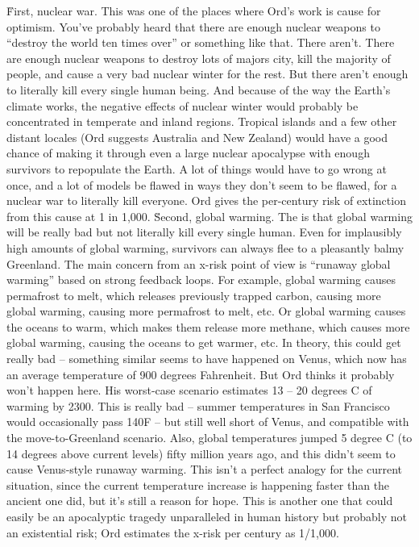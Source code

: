 \begin{xmlentries}
\begin{xmlentriescontent}
{\p\u{First}, nuclear war. This was one of the places where Ord’s work is cause for optimism. You’ve probably heard that there are enough nuclear weapons to “destroy the world ten times over” or something like that. There aren’t. There are enough nuclear weapons to destroy lots of majors city, kill the majority of people, and cause a very bad nuclear winter for the rest. But there aren’t enough to literally kill every single human being. And because of the way the Earth’s climate works, the negative effects of nuclear winter would probably be concentrated in temperate and inland regions. Tropical islands and a few other distant locales (Ord suggests Australia and New Zealand) would have a good chance of making it through even a large nuclear apocalypse with enough survivors to repopulate the Earth. A lot of things would have to go wrong at once, and a lot of models be flawed in ways they don’t seem to be flawed, for a nuclear war to literally kill everyone. Ord gives the per-century risk of extinction from this cause at 1 in 1,000.
\p\u{Second}, global warming. The  is that global warming will be really bad but not literally kill every single human. Even for implausibly high amounts of global warming, survivors can always flee to a pleasantly balmy Greenland. The main concern from an x-risk point of view is “runaway global warming” based on strong feedback loops. For example, global warming causes permafrost to melt, which releases previously trapped carbon, causing more global warming, causing more permafrost to melt, etc. Or global warming causes the oceans to warm, which makes them release more methane, which causes more global warming, causing the oceans to get warmer, etc. In theory, this could get really bad – something similar seems to have happened on Venus, which now has an average temperature of 900 degrees Fahrenheit. But Ord thinks it probably won’t happen here. His worst-case scenario estimates 13 – 20 degrees C of warming by 2300. This is really bad – summer temperatures in San Francisco would occasionally pass 140F – but still well short of Venus, and compatible with the move-to-Greenland scenario. Also, global temperatures jumped 5 degree C (to 14 degrees above current levels) fifty million years ago, and this didn’t seem to cause Venus-style runaway warming. This isn’t a perfect analogy for the current situation, since the current temperature increase is happening faster than the ancient one did, but it’s still a reason for hope. This is another one that could easily be an apocalyptic tragedy unparalleled in human history but probably not an existential risk; Ord estimates the x-risk per century as 1/1,000.
}
\end{xmlentriescontent}
\end{xmlentries}
